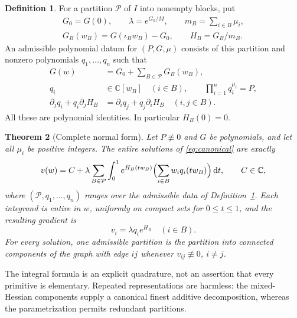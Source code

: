 \documentclass[11pt]{article}
\numberwithin{equation}{section}
\newtheorem{theorem}{Theorem}[section]
\theoremstyle{definition}\newtheorem{definition}[theorem]{Definition}
\theoremstyle{remark}\newtheorem{remark}[theorem]{Remark}
\newcommand{\C}{\mathbb C}
\newcommand{\dd}{\,\mathrm d}
\newcommand{\Pc}{\mathcal P}
\begin{document}
\begin{definition}\label{def:data}
For a partition $\Pc$ of $I$ into nonempty blocks, put
\begin{equation}\label{eq:phases}
 \begin{gathered}
 G_0=G(0),\qquad \lambda=e^{G_0/M},\qquad
 m_B=\sum_{i\in B}\mu_i,\\
 G_B(w_B)=G(\iota_Bw_B)-G_0,\qquad H_B=G_B/m_B.
 \end{gathered}
\end{equation}
An admissible polynomial datum for $(P,G,\mu)$ consists of this partition
and nonzero polynomials $q_1,\ldots,q_n$ such that
\begin{align}
 G(w)&=G_0+\sum_{B\in\Pc}G_B(w_B),\label{eq:add}\\
 q_i&\in\C[w_B]\quad(i\in B),\qquad
 \prod_{i=1}^n q_i^{\mu_i}=P,\label{eq:factor}\\
 \partial_jq_i+q_i\partial_jH_B
 &=\partial_iq_j+q_j\partial_iH_B
 \quad(i,j\in B).\label{eq:closed}
\end{align}
All these are polynomial identities. In particular $H_B(0)=0$.
\end{definition}

\begin{theorem}[Complete normal form]\label{thm:normal}
Let $P\not\equiv0$ and $G$ be polynomials, and let all $\mu_i$ be positive
integers. The entire solutions of \eqref{eq:canonical} are exactly
\begin{equation}\label{eq:integral}
 v(w)=C+\lambda\sum_{B\in\Pc}\int_0^1
 e^{H_B(tw_B)}\Bigl(\sum_{i\in B}w_iq_i(tw_B)\Bigr)\dd t,
 \qquad C\in\C,
\end{equation}
where $(\Pc,q_1,\ldots,q_n)$ ranges over the admissible data of
Definition~\ref{def:data}. Each integrand is entire in $w$, uniformly on
compact sets for $0\leq t\leq1$, and the resulting gradient is
\begin{equation}\label{eq:gradient}
 v_i=\lambda q_i e^{H_B}\quad(i\in B).
\end{equation}
For every solution, one admissible partition is the partition into
connected components of the graph with edge $ij$ whenever
$v_{ij}\not\equiv0$, $i\ne j$.
\end{theorem}

The integral formula is an explicit quadrature, not an assertion that every
primitive is elementary. Repeated representations are harmless: the
mixed-Hessian components supply a canonical finest additive decomposition,
whereas the parametrization permits redundant partitions.
\end{document}
